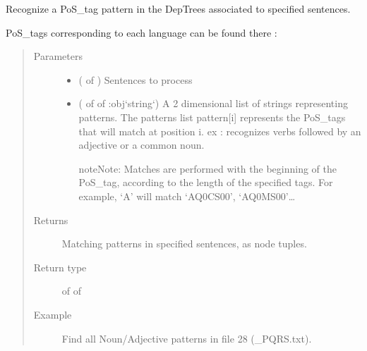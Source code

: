 \documentclass[letterpaper,10pt,english]{sphinxmanual}
\begin{document}
\begin{fulllineitems}
\label{\detokenize{analysis:loacore.analysis.pattern_recognition.pos_tag_patterns_recognition}}
Recognize a PoS\_tag pattern in the DepTrees associated to specified sentences.

PoS\_tags corresponding to each language can be found there :
\begin{quote}\begin{description}
\item[{Parameters}] \leavevmode\begin{itemize}
\item {} 
 ( of ) \textendash{} Sentences to process

\item {} 
 ( of  of :obj{}`string{}`) \textendash{} 
A 2 dimensional list of strings representing patterns. The patterns list pattern{[}i{]} represents the PoS\_tags that
will match at position i. ex :  recognizes verbs followed by an adjective or a
common noun.

\begin{sphinxadmonition}{note}{Note:}
Matches are performed with the beginning of the PoS\_tag, according to the length of the specified
tags. For example, ‘A’ will match ‘AQ0CS00’, ‘AQ0MS00’…
\end{sphinxadmonition}


\end{itemize}

\item[{Returns}] \leavevmode
Matching patterns in specified sentences, as node tuples.

\item[{Return type}] \leavevmode
{} of  of 

\item[{Example}] \leavevmode
Find all Noun/Adjective patterns in file 28 (\_PQRS.txt).


\end{description}
\end{quote}
\end{fulllineitems}
\end{document}
